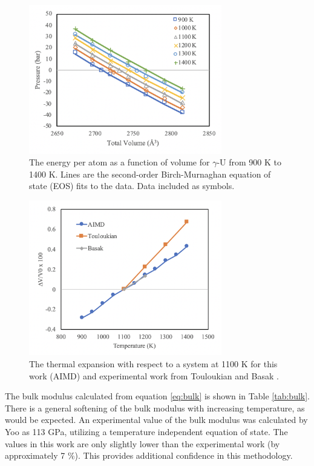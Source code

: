 \documentclass[review]{elsarticle}
\begin{document}
\begin{figure}[h]
 \centering
 \includegraphics[width=0.75\textwidth]{2_p_vs_v.png} 
 \caption{The energy per atom as a function of volume for $\gamma$-U from 900 K to 1400 K. Lines are the second-order Birch-Murnaghan equation of state (EOS) fits to the data. Data included as symbols. }
 \label{fig:pvsv}
\end{figure}

\begin{figure}[h]
 \centering
 \includegraphics[width=0.75\textwidth]{3_thermal_exp.png} 
 \caption{The thermal expansion with respect to a system at 1100 K for this work (AIMD) and experimental work from Touloukian \cite{touloukian} and Basak \cite{basak} .   }
 \label{fig:exp}
\end{figure}

\FloatBarrier

The bulk modulus calculated from equation \ref{eq:bulk} is shown in Table \ref{tab:bulk}. There is a general softening of the bulk modulus with increasing temperature, as would be expected. An experimental value of the bulk modulus was calculated by Yoo \cite{yoo1998} as 113 GPa, utilizing a temperature independent equation of state. The values in this work are only slightly lower than the experimental work (by approximately 7 {\%}). This provides additional confidence in this methodology. 
\end{document}
